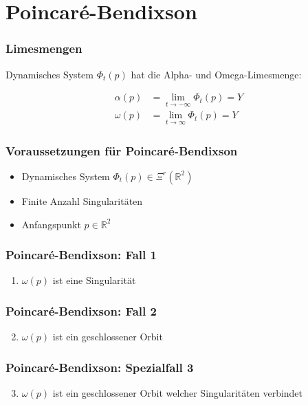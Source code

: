 \documentclass[ngerman, aspectratio=169]{beamer}
\begin{document}
	\section{Poincaré-Bendixson}
    \begin{frame}
    \frametitle{Limesmengen}
        Dynamisches System $\Phi_t(p)$ hat die Alpha- und Omega-Limesmenge:

        \begin{align*}
            \alpha(p) &= \lim_{t\to-\infty} \Phi_t(p) = Y \\
            \omega(p) &= \lim_{t\to\infty} \Phi_t(p) = Y
        \end{align*}
    \end{frame}
    \begin{frame}
    \frametitle{Voraussetzungen für Poincaré-Bendixson}
        \begin{itemize}
            \item Dynamisches System $\Phi_t(p) \in \Xi^r(\mathbb{R}^2)$
            \item Finite Anzahl Singularitäten
            \item Anfangspunkt $p \in \mathbb{R}^2$
        \end{itemize}
    \end{frame}
    \begin{frame}
    \frametitle{Poincaré-Bendixson: Fall 1}
        \begin{enumerate}
            \item $\omega(p)$ ist eine Singularität
        \end{enumerate}
    \end{frame}
    \begin{frame}
    \frametitle{Poincaré-Bendixson: Fall 2}
        \begin{enumerate}
            \setcounter{enumi}{1}
            \item $\omega(p)$ ist ein geschlossener Orbit
        \end{enumerate}
    \end{frame}
    \begin{frame}
    \frametitle{Poincaré-Bendixson: Spezialfall 3}
        \begin{enumerate}
            \setcounter{enumi}{2}
            \item $\omega(p)$ ist ein geschlossener Orbit welcher Singularitäten verbindet
        \end{enumerate}
    \end{frame}
\end{document}
